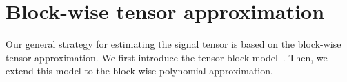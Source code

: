 \documentclass{article}
\theoremstyle{definition}
\begin{document}
\vspace{-.2cm}
\section{Block-wise tensor approximation }\label{sec:tba}
\vspace{-.2cm}
Our general strategy for estimating the signal tensor is based on the block-wise tensor approximation. We first introduce the tensor block model~\citep{wang2019multiway,han2020exact}. Then, we extend this model to the block-wise polynomial approximation.
\vspace{-.2cm}
\end{document}
